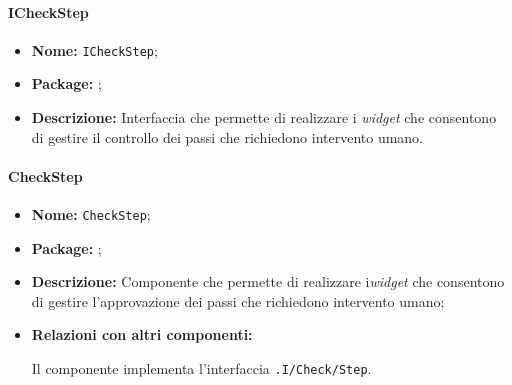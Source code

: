 \paragraph{ICheckStep}
\begin{itemize}
\item \textbf{Nome:} \texttt{ICheckStep};
\item \textbf{Package:} \texttt{\viewAdmin{}};
\item \textbf{Descrizione:} Interfaccia che permette di realizzare i \textit{widget} che consentono di gestire il controllo dei passi che richiedono intervento umano.
\end{itemize}

\paragraph{CheckStep}
\begin{flushleft}
\begin{itemize}
\item \textbf{Nome:} \texttt{CheckStep};
\item \textbf{Package:} \texttt{\viewAdmin{}};
\item \textbf{Descrizione:} Componente che permette di realizzare i\textit{widget} che consentono di gestire l'approvazione dei passi che richiedono intervento umano;
\item \textbf{Relazioni con altri componenti:}
\begin{sloppypar}
Il componente implementa l'interfaccia \texttt{\viewAdmin{}.I\fshyp{}Check\fshyp{}Step}.
\end{sloppypar}
\end{itemize}
\end{flushleft}
